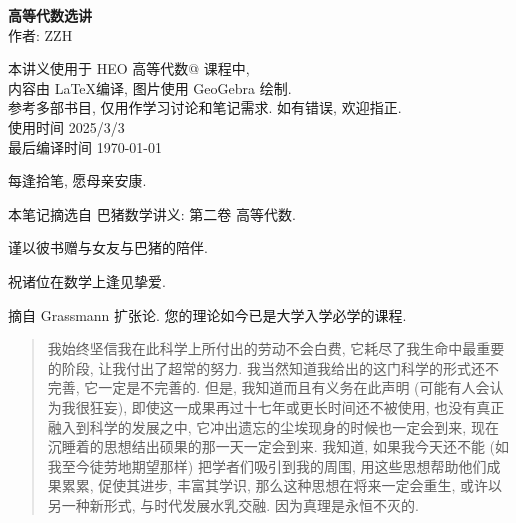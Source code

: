 \documentclass[UTF8]{book}
\makeatletter
\newcommand{\Rmnum}[1]{\expandafter\@slowromancap\romannumeral #1@}
\makeatother
\begin{document}



\begin{titlepage}
    \vspace*{10em}
\begin{center}
    \textbf{\songti 高等代数选讲} \\ %
    \vspace{4em} %
    作者: ZZH \\ %
    \vspace{10em} %

    本讲义使用于 HEO 高等代数\Rmnum{2} 课程中, \\
    内容由 \LaTeX 编译, 图片使用 GeoGebra 绘制. \\
    参考多部书目, 仅用作学习讨论和笔记需求. 如有错误, 欢迎指正. \\
    使用时间 2025/3/3\\

    最后编译时间 \today\\
\end{center}

\end{titlepage} 

\newpage

\vspace*{5em}

每逢拾笔, 愿母亲安康. 

本笔记摘选自 巴猪数学讲义: 第二卷 高等代数. 

谨以彼书赠与女友与巴猪的陪伴. 

祝诸位在数学上逢见挚爱. 

\vspace*{5em}

摘自 Grassmann 扩张论. 您的理论如今已是大学入学必学的课程. 

\begin{quotation}
    \kaishu
    我始终坚信我在此科学上所付出的劳动不会白费, 它耗尽了我生命中最重要的阶段, 
    让我付出了超常的努力. 我当然知道我给出的这门科学的形式还不完善, 
    它一定是不完善的. 但是, 我知道而且有义务在此声明 (可能有人会认为我很狂妄), 
    即使这一成果再过十七年或更长时间还不被使用, 也没有真正融入到科学的发展之中, 
    它冲出遗忘的尘埃现身的时候也一定会到来, 现在沉睡着的思想结出硕果的那一天一定会到来. 
    我知道, 如果我今天还不能 (如我至今徒劳地期望那样) 把学者们吸引到我的周围, 
    用这些思想帮助他们成果累累, 促使其进步, 丰富其学识, 
    那么这种思想在将来一定会重生, 或许以另一种新形式, 与时代发展水乳交融. 
    因为真理是永恒不灭的. 
    \songti
\end{quotation}
\end{document}
